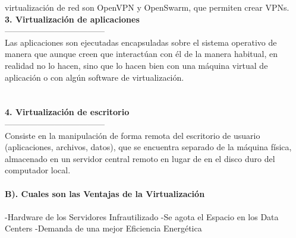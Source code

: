 \documentclass[twoside,twocolumn]{article}
\begin{document}
\begin{flushright}
\begin{itemize}
virtualización de red son OpenVPN y OpenSwarm, que permiten crear VPNs. 
\textbf{}\\
\textbf{3. Virtualización de aplicaciones }\\
------------------------------------
\textbf{}\\
 Las aplicaciones son ejecutadas encapsuladas sobre el
sistema operativo  de manera que aunque
creen que interactúan con él de la manera habitual, en realidad no
lo hacen, sino que lo hacen bien con una máquina virtual de aplicación o con algún
software de virtualización. 
\textbf{}\\
\textbf{}\\
\textbf{}\\
\textbf{4. Virtualización de escritorio }\\
------------------------------------
\textbf{}\\
 Consiste en la manipulación de forma remota del escritorio
de usuario (aplicaciones, archivos, datos), que se encuentra separado de la máquina
física, almacenado en un servidor central remoto en lugar de en el disco duro del
computador local. 
\textbf{}\\
\textbf{}\\
 \textbf{B). Cuales son las Ventajas de la Virtualización}\\

\textbf{}\\
-Hardware de los Servidores Infrautilizado
-Se agota el Espacio en los Data Centers 
-Demanda de una mejor Eficiencia Energética 

\textbf{}\\
\textbf{}\\
\textbf{}\\










\end{itemize}
\end{flushright}
\end{document}

